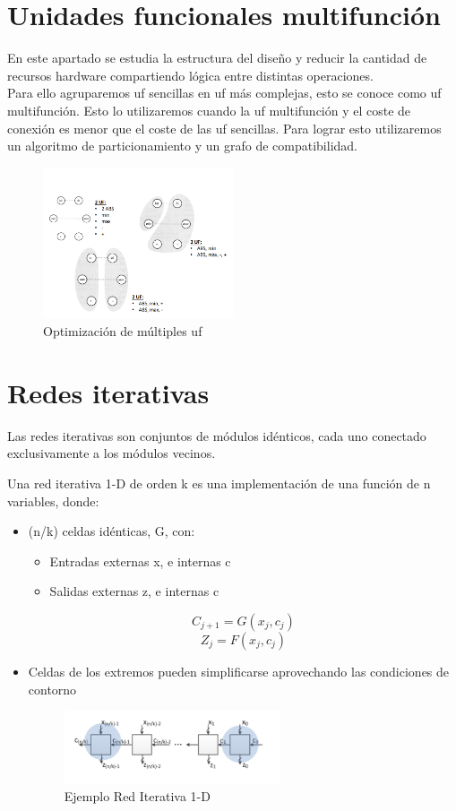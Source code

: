 \section{Unidades funcionales multifunción}
En este apartado se estudia la estructura del diseño y reducir la cantidad de recursos hardware compartiendo lógica entre distintas operaciones.\\
Para ello agruparemos \gls{uf} sencillas en \gls{uf} más complejas, esto se conoce como \gls{uf} multifunción. Esto lo utilizaremos cuando la \gls{uf} multifunción y el coste de conexión es menor que el coste de las \gls{uf} sencillas. Para lograr esto utilizaremos un algoritmo de particionamiento y un grafo de compatibilidad.
\begin{figure}[H]
	\centering
	\includegraphics[width=0.5\textwidth]{images/Tema_3/Optimizacion.PNG}
	\caption{Optimización de múltiples \gls{uf}}
\end{figure}

\section{Redes iterativas}
Las redes iterativas son conjuntos de módulos idénticos, cada uno conectado exclusivamente a los módulos vecinos.

Una red iterativa 1-D de orden k es una implementación de una función de n variables, donde:
\begin{itemize}
	\item (n/k) celdas idénticas, G, con:
	      \begin{itemize}
		      \item Entradas externas x, e internas c
		      \item Salidas externas z, e internas c
	      \end{itemize}
	      \[
		      C_{j+1}=G\left(x_{j},c_{j}\right)
	      \]
	      \[
		      Z_{j}=F\left(x_{j}, c_{j}\right)
	      \]

	\item Celdas de los extremos pueden simplificarse aprovechando las condiciones de contorno
	      \begin{figure}[H]
		      \centering
		      \includegraphics[width=0.6\textwidth]{images/Tema_3/Ejemplo_RI.PNG}
		      \caption{Ejemplo Red Iterativa 1-D}
	      \end{figure}
\end{itemize}

